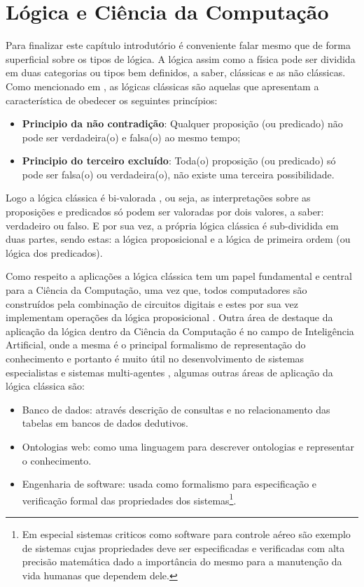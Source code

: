 \section{Lógica e Ciência da Computação}\label{sec:LogicsAndComputation}

Para finalizar este capítulo introdutório é conveniente falar mesmo que de forma superficial sobre os tipos de lógica. A lógica assim como a física pode ser dividida em duas categorias ou tipos bem definidos, a saber, clássicas e as não clássicas. Como mencionado em  \cite{benja-Logica, edgar2002}, as lógicas clássicas são aquelas que apresentam a característica de obedecer os seguintes princípios: 

\begin{itemize}
	\item \textbf{Principio da não contradição}: Qualquer proposição (ou predicado) não pode ser verdadeira(o) e falsa(o) ao mesmo tempo;
	\item \textbf{Principio do terceiro excluído}: Toda(o) proposição  (ou predicado) só pode ser falsa(o) ou verdadeira(o), não existe uma terceira possibilidade. 
\end{itemize}

Logo a lógica clássica é bi-valorada \cite{edgar2002}, ou seja, as interpretações sobre as proposições e predicados só podem ser valoradas por dois valores, a saber: verdadeiro ou falso. E por sua vez, a própria lógica clássica é sub-dividida em duas partes, sendo estas: a lógica proposicional e a lógica de primeira ordem (ou lógica dos predicados).

Como respeito a aplicações a lógica clássica tem um papel fundamental e central para a Ciência da Computação, uma vez que, todos computadores são construídos pela combinação de circuitos digitais e estes por sua vez implementam operações da lógica proposicional \cite{abe2002-logica, nunes2008}. Outra área de destaque da aplicação da lógica dentro da Ciência da Computação é no campo de Inteligência Artificial, onde a mesma é o principal formalismo de representação do conhecimento e portanto é muito útil no desenvolvimento de sistemas especialistas e sistemas multi-agentes \cite{benja-Logica}, algumas outras áreas de aplicação da lógica clássica são:

\begin{itemize}
	\item Banco de dados: através descrição de consultas e no relacionamento das
tabelas em bancos de dados dedutivos.
	\item Ontologias web: como uma linguagem para descrever
ontologias e representar o conhecimento.
	\item Engenharia de software: usada como formalismo para especificação e verificação formal das propriedades dos sistemas\footnote{Em especial sistemas criticos como software para controle aéreo são exemplo de sistemas cujas propriedades deve ser especificadas e verificadas com alta precisão matemática dado a importância do mesmo para a manutenção da vida humanas que dependem dele.}.
\end{itemize}

